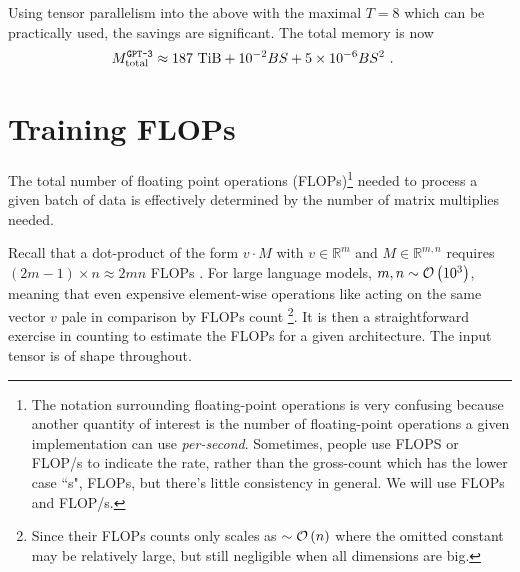 \documentclass[11pt]{article}
\begin{document}
Using tensor parallelism into the above with the maximal $ T=8 $ which can be practically used, the
savings are significant. The total memory is now
\begin{align}
	M _{ {\rm total}  } ^{ \texttt{GPT-3}  } & \approx 187\ {\rm TiB} + 10 ^{ -2 }BS + 5 \times 10 ^{
			-6} BS ^{ 2 }\ .
\end{align}




\section{Training FLOPs \label{sec_flops_training} }

The total number of floating point operations (FLOPs)\footnote{The notation surrounding
	floating-point operations is very confusing because another quantity of interest is the number
	of floating-point operations a given implementation can use \textit{per-second}. Sometimes,
	people use FLOPS or FLOP/s to indicate the rate, rather than the gross-count which has the lower
	case ``s", FLOPs, but there's little consistency in general. We will use FLOPs and FLOP/s.}  needed to process a given batch of
data is effectively determined by the number of matrix multiplies needed.

Recall that a dot-product of the form $ v \cdot M $  with $ v \in \mathbb{R}^{ m } $ and $ M \in
	\mathbb{R} ^{ m, n }$ requires $ \left (2 m-1 \right )\times n \approx 2mn$ FLOPs .
For large language models, $ m,n \sim \mathcal{O} \left( 10 ^{ 3 } \right)  $, meaning that even expensive
element-wise operations like  acting on the same vector $ v $ pale in comparison by
FLOPs count \footnote{Since their FLOPs counts only scales as $ \sim \mathcal{O} \left( n\right )  $ where
	the omitted constant may be relatively large, but still negligible when all dimensions are big.}. It
is then a straightforward exercise in counting to estimate the FLOPs for a given architecture. The
input tensor is of shape  throughout.
\end{document}
